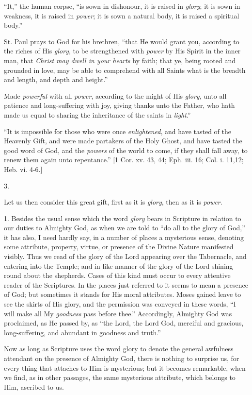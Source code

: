 ``It,'' the human corpse, ``is sown in dishonour, it is
raised in \emph{glory}; it is sown in weakness, it is raised in \emph{power};
it is sown a natural body, it is raised a spiritual body.''

St. Paul prays to God for his brethren, ``that He would grant
you, according to the riches of His \emph{glory}, to be strengthened
with \emph{power} by His Spirit in the inner man, that \emph{Christ may
dwell in your hearts} by faith; that ye, being rooted and grounded
in love, may be able to comprehend with all Saints what is the breadth
and length, and depth and height.''

Made \emph{powerful} with all \emph{power}, according to the might
of His \emph{glory}, unto all patience and long-suffering with joy,
giving thanks unto the Father, who hath made us equal to sharing the
inheritance of the saints in \emph{light}.''

``It is impossible for those who were once \emph{enlightened},
and have tasted of the Heavenly Gift, and were made partakers of the
Holy Ghost, and have tasted the good word of God, and the \emph{powers}
of the world to come, if they shall fall away, to renew them again
unto repentance.'' [1 Cor. xv. 43, 44; Eph. iii. 16; Col. i.
11,12; Heb. vi. 4-6.]

3.

Let us then consider this great gift, first as it is \emph{glory},
then as it is \emph{power}.

1. Besides the usual sense which the word \emph{glory} bears in
Scripture in relation to our duties to Almighty God, as when we are
told to ``do all to the glory of God,'' it has also, I need
hardly say, in a number of places a mysterious sense, denoting some
attribute, property, virtue, or presence of the Divine Nature
manifested visibly. Thus we read of the glory of the Lord
appearing over the Tabernacle, and entering into the Temple; and in
like manner of the glory of the Lord shining round about the
shepherds. Cases of this kind must occur to every attentive reader of
the Scriptures. In the places just referred to it seems to mean a
presence of God; but sometimes it stands for His moral attributes.
Moses gained leave to see the skirts of His glory, and the permission
was conveyed in these words, ``I will make all My \emph{goodness}
pass before thee.'' Accordingly, Almighty God was proclaimed, as
He passed by, as ``the Lord, the Lord God, merciful and gracious,
long-suffering, and abundant in goodness and truth.''

Now as long as Scripture uses the word glory to denote the general
awfulness attendant on the presence of Almighty God, there is nothing
to surprise us, for every thing that attaches to Him is mysterious;
but it becomes remarkable, when we find, as in other passages, the
same mysterious attribute, which belongs to Him, ascribed to us.

